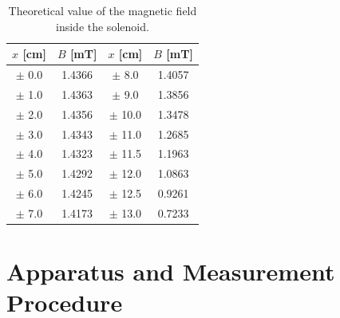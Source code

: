 \documentclass[a4paper]{article}
\begin{document}
\begin{table}[!htbp]
	\centering
	\begin{tabular}{cc||cc}
		\hline
		$x$ [cm]  & $B$ [mT] & $x$ [cm]   & $B$ [mT] \\
		\hline
		$\pm$ 0.0 & 1.4366   & $\pm$ 8.0  & 1.4057   \\
		$\pm$ 1.0 & 1.4363   & $\pm$ 9.0  & 1.3856   \\
		$\pm$ 2.0 & 1.4356   & $\pm$ 10.0 & 1.3478   \\
		$\pm$ 3.0 & 1.4343   & $\pm$ 11.0 & 1.2685   \\
		$\pm$ 4.0 & 1.4323   & $\pm$ 11.5 & 1.1963   \\
		$\pm$ 5.0 & 1.4292   & $\pm$ 12.0 & 1.0863   \\
		$\pm$ 6.0 & 1.4245   & $\pm$ 12.5 & 0.9261   \\
		$\pm$ 7.0 & 1.4173   & $\pm$ 13.0 & 0.7233   \\
		\hline
	\end{tabular}
	\caption{Theoretical value of the magnetic field inside the solenoid.}
	\label{table::theoretical value}
\end{table}

\section{Apparatus and Measurement Procedure}
\end{document}
